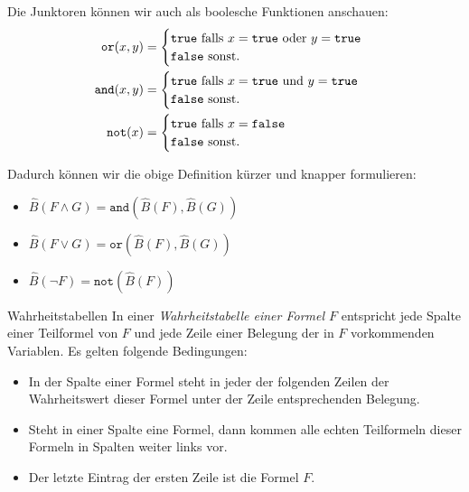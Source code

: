 Die Junktoren können wir auch als boolesche Funktionen anschauen:
\begin{align*}
    \texttt{or} (x,y) &= \begin{cases}
                             \true$ falls $x = \true$ oder $y = \true \\ \false$ sonst. $
    \end{cases}\\
    \texttt{and} (x,y) &= \begin{cases}
                              \true$ falls $x = \true$ und $y = \true \\ \false$ sonst. $
    \end{cases}\\
    \texttt{not} (x) &= \begin{cases}
                            \true$ falls $x = \false \\ \false$ sonst. $
    \end{cases}
\end{align*}

\vspace{-\topsep}

Dadurch können wir die obige Definition kürzer und knapper formulieren:
\begin{multicols}{3}
    \begin{itemize}
        \item $\widehat{B}(F \land G) = \texttt{and}(\widehat{B}(F), \widehat{B}(G))$
        \item $\widehat{B}(F \lor G) = \texttt{or}(\widehat{B}(F), \widehat{B}(G))$
        \item $\widehat{B}(\neg F) = \texttt{not}(\widehat{B}(F))$
    \end{itemize}
\end{multicols}

\begin{definition}{Wahrheitstabellen}
    In einer \emph{Wahrheitstabelle einer Formel $F$} entspricht jede Spalte einer Teilformel von $F$ und jede Zeile einer Belegung der in $F$ vorkommenden Variablen.
    Es gelten folgende Bedingungen:
    \begin{itemize}
        \item In der Spalte einer Formel steht in jeder der folgenden Zeilen der Wahrheitswert dieser Formel unter der Zeile entsprechenden Belegung.
        \item Steht in einer Spalte eine Formel, dann kommen alle echten Teilformeln dieser Formeln in Spalten weiter links vor.
        \item Der letzte Eintrag der ersten Zeile ist die Formel $F$.
    \end{itemize}
\end{definition}

